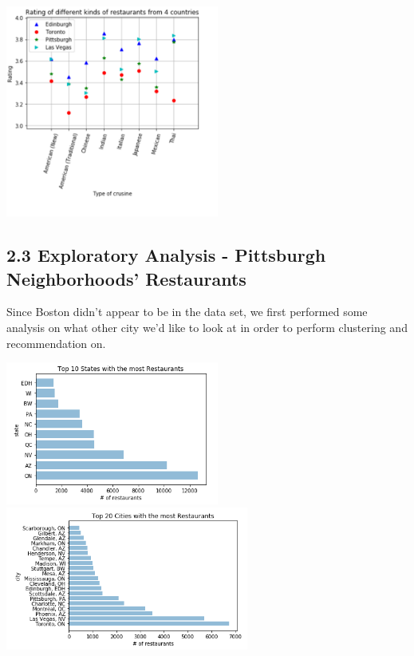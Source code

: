 \documentclass{neu_handout}
\begin{document}
\begin{center}
	\includegraphics[width=70mm,scale=0.5]{Rating_different_restaurants_countries.png}
\end{center}

\subsection*{2.3 Exploratory Analysis - Pittsburgh Neighborhoods' Restaurants}

   Since Boston didn't appear to be in the data set, we first performed some analysis on what other city we'd like to look at in order to perform clustering and recommendation on.
   
\begin{center}
\includegraphics[width=70mm,scale=0.5]{states}
\includegraphics[width=80mm,scale=0.5]{cities}
\end{center}
   
\end{document}
